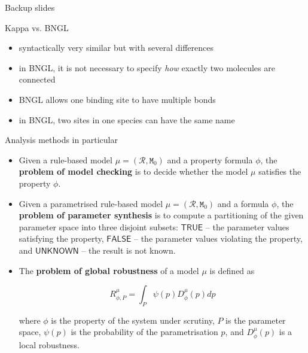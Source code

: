 \documentclass[10pt]{beamer}
\begin{document}
\begin{frame}
\thispagestyle{empty}
  {\huge Backup slides \\}
\end{frame}


\begin{frame}[fragile]{Kappa vs. BNGL}

\begin{itemize}
\item syntactically very similar but with several differences
\item in BNGL, it is not necessary to specify \emph{how} exactly two molecules are connected
\item BNGL allows one binding site to have multiple bonds
\item in BNGL, two sites in one species can have the same name
\end{itemize}

\end{frame}


\begin{frame}[fragile]{Analysis methods in particular}

{\small

\begin{itemize}
\item Given a rule-based model $\mu = (\mathcal{R}, \mathtt{M}_0)$ and a property formula $\phi$, the \textbf{problem of model checking} is to decide whether the model $\mu$ satisfies the property $\phi$.

\item Given a parametrised rule-based model $\mu = (\mathcal{R}, \mathtt{M}_0)$ and a formula $\phi$, the \textbf{problem of parameter synthesis} is to compute a partitioning of the given parameter space into three disjoint subsets: $\mathsf{TRUE}$ -- the parameter values satisfying the property, $\mathsf{FALSE}$ -- the parameter values violating the property, and $\mathsf{UNKNOWN}$ -- the result is not known.

\item The \textbf{problem of global robustness} of a model $\mu$ is defined as 

$$ R^{\mu}_{\phi, P} = \int_{P} \psi(p) D^{\mu}_{\phi}(p) dp $$

where $\phi$ is the property of the system under scrutiny, $P$ is the parameter space, $\psi(p)$ is the probability of the parametrisation $p$, and $D^{\mu}_{\phi}(p)$ is a local robustness.
\end{itemize}
}

\end{frame}
\end{document}
